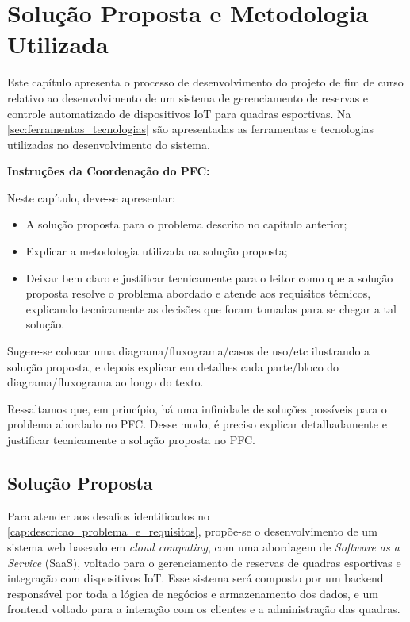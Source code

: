 \chapter{Solução Proposta e Metodologia Utilizada}\label{cap:solucao_proposta}

Este capítulo apresenta o processo de desenvolvimento do projeto de fim de curso relativo ao desenvolvimento de um sistema de gerenciamento de reservas e controle automatizado de dispositivos IoT para quadras esportivas. Na \autoref{sec:ferramentas_tecnologias} são apresentadas as ferramentas e tecnologias utilizadas no desenvolvimento do sistema. 


\textbf{Instruções da Coordenação do PFC:}

Neste capítulo, deve-se apresentar:
\begin{itemize}
	\item A solução proposta para o problema descrito no capítulo anterior;
	\item Explicar a metodologia utilizada na solução proposta;
	\item Deixar bem claro e justificar tecnicamente para o leitor como que a solução proposta resolve o problema abordado e atende aos requisitos técnicos, explicando tecnicamente as decisões que foram tomadas para se chegar a tal solução.
\end{itemize}

Sugere-se colocar uma diagrama/fluxograma/casos de uso/etc ilustrando a solução proposta, e depois explicar em detalhes cada parte/bloco do diagrama/fluxograma ao longo do texto. 

Ressaltamos que, em princípio, há uma infinidade de soluções possíveis para o problema abordado no PFC. Desse modo, é preciso explicar detalhadamente e justificar tecnicamente a solução proposta no PFC.

\section{Solução Proposta}

Para atender aos desafios identificados no \autoref{cap:descricao_problema_e_requisitos}, propõe-se o desenvolvimento de um sistema web baseado em \textit{cloud computing}, com uma abordagem de \textit{Software as a Service} (SaaS), voltado para o gerenciamento de reservas de quadras esportivas e integração com dispositivos IoT. Esse sistema será composto por um backend responsável por toda a lógica de negócios e armazenamento dos dados, e um frontend voltado para a interação com os clientes e a administração das quadras.

